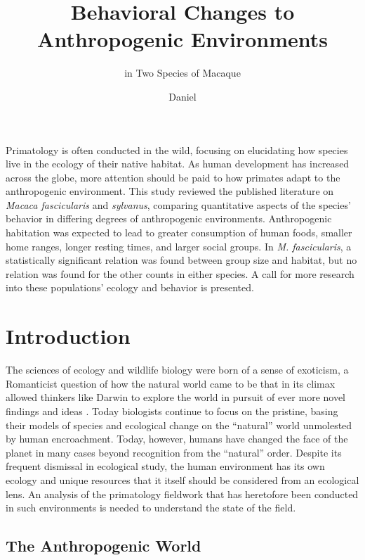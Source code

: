 \documentclass{../../../coursework}
\title{Behavioral Changes to Anthropogenic Environments }
\subtitle{in Two Species of Macaque}
\author{Daniel}{Glenn}{Leonard}
\date{\displaydate{date}}
\begin{document}
\maketitle

\begin{smartabs}
    Primatology is often conducted in the wild, focusing on elucidating how
    species live in the ecology of their native habitat. As human development
    has increased across the globe, more attention should be paid to how
    primates adapt to the anthropogenic environment. This study reviewed the
    published literature on \textit{Macaca fascicularis} and
    \textit{sylvanus}, comparing quantitative aspects of the species' behavior
    in differing degrees of anthropogenic environments. Anthropogenic
    habitation was expected to lead to greater consumption of human foods,
    smaller home ranges, longer resting times, and larger social groups. In
    \textit{M. fascicularis}, a statistically
    significant relation was found between group size and habitat, but no
    relation was found for the other counts in either species. A call for more
    research into these populations' ecology and behavior is presented.
\end{smartabs}

\section{Introduction}

The sciences of ecology and wildlife biology were born of a sense of
exoticism, a Romanticist question of how the natural world came to be that in
its climax allowed thinkers like Darwin to explore the world in pursuit of
ever more novel findings and ideas \parencite{Nic05}. Today biologists
continue to focus on the pristine, basing their models of species and
ecological change on the ``natural'' world unmolested by human encroachment.
Today, however, humans have changed the face of the planet in many cases
beyond recognition from the ``natural'' order. Despite its frequent dismissal
in ecological study, the human environment has its own ecology and unique
resources that it itself should be considered from an ecological lens. An
analysis of the primatology fieldwork that has heretofore been conducted in
such environments is needed to understand the state of the field.

\subsection{The Anthropogenic World}
\end{document}
